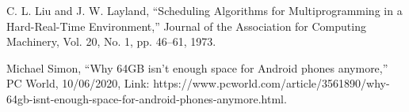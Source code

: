 \begin{thebibliography}{1}
	C. L. Liu and J. W. Layland, \enquote{Scheduling Algorithms for Multiprogramming in a Hard-Real-Time Environment,} Journal of the Association for Computing Machinery, Vol. 20, No. 1, pp. 46--61, 1973.
	
	Michael Simon, \enquote{Why 64GB isn't enough space for Android phones anymore,} PC World, 10/06/2020,
	Link: https://www.pcworld.com/article/3561890/why-64gb-isnt-enough-space-for-android-phones-anymore.html.
\end{thebibliography}